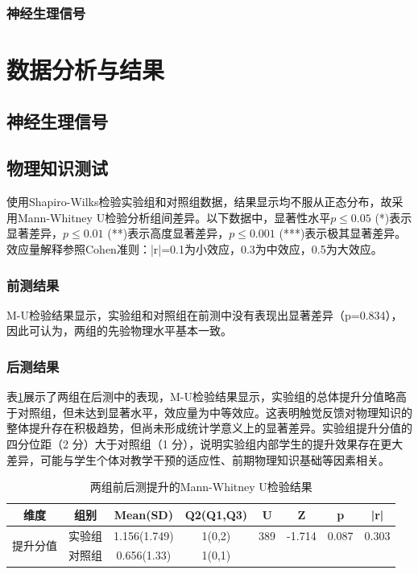 \documentclass[runningheads]{llncs}
\begin{document}
\subsubsection{神经生理信号}

\section{数据分析与结果}
\subsection{神经生理信号}

\subsection{物理知识测试}
使用Shapiro-Wilks检验实验组和对照组数据，结果显示均不服从正态分布，故采用Mann-Whitney U检验分析组间差异。以下数据中，显著性水平$p \le 0.05$ (*)表示显著差异，$p \le 0.01$ (**)表示高度显著差异，$p \le 0.001$ (***)表示极其显著差异。效应量解释参照Cohen准则：|r|=0.1为小效应，0.3为中效应，0.5为大效应。

\subsubsection{前测结果}
M-U检验结果显示，实验组和对照组在前测中没有表现出显著差异（p=0.834），因此可认为，两组的先验物理水平基本一致。

\subsubsection{后测结果}
表\ref{tab:learning-effect}展示了两组在后测中的表现，M-U检验结果显示，实验组的总体提升分值略高于对照组，但未达到显著水平，效应量为中等效应。这表明触觉反馈对物理知识的整体提升存在积极趋势，但尚未形成统计学意义上的显著差异。实验组提升分值的四分位距（2 分）大于对照组（1 分），说明实验组内部学生的提升效果存在更大差异，可能与学生个体对教学干预的适应性、前期物理知识基础等因素相关。

\begin{table}[t]
\centering
\setlength{\tabcolsep}{6pt} %
\caption{两组前后测提升的Mann-Whitney U检验结果}
\label{tab:learning-effect}
\begin{tabular}{cccccccc}
\toprule
\textbf{维度} & \textbf{组别} & \textbf{Mean(SD)} & \textbf{Q2(Q1,Q3)} & \textbf{U} & \textbf{Z} & \textbf{p} & \textbf{|r|} \\
\midrule
\multirow{2}{*}{提升分值} 
& 实验组 & 1.156(1.749) & 1(0,2) & 389 & -1.714 & 0.087 & 0.303 \\
& 对照组 & 0.656(1.33) & 1(0,1) &  &  &  &  \\
\bottomrule
\end{tabular}
\end{table}
\end{document}
